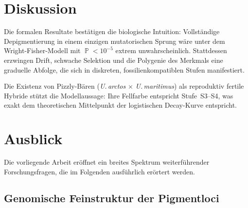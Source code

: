 ﻿\documentclass[12pt,a4paper]{article}
\theoremstyle{remark}
\DeclareMathOperator{\Prob}{\mathbb{P}}
\begin{document}
\section{Diskussion}

Die formalen Resultate best\"{a}tigen die biologische Intuition: Vollst\"{a}ndige
Depigmentierung in einem einzigen mutatorischen Sprung w\"{a}re unter dem
Wright-Fisher-Modell mit $\Prob < 10^{-5}$ extrem unwahrscheinlich.
Stattdessen erzwingen Drift, schwache Selektion und die Polygenie des
Merkmals eine graduelle Abfolge, die sich in diskreten, fossilienkompatiblen
Stufen manifestiert.

Die Existenz von Pizzly-B\"{a}ren (\textit{U.\,arctos} $\times$
\textit{U.\,maritimus}) als reproduktiv fertile Hybride st\"{u}tzt die Modellaussage:
Ihre Fellfarbe entspricht Stufe~S3--S4, was exakt dem theoretischen
Mittelpunkt der logistischen Decay-Kurve entspricht.

\section{Ausblick}
\label{sec:ausblick}

Die vorliegende Arbeit er\"{o}ffnet ein breites Spektrum weiterf\"{u}hrender
Forschungsfragen, die im Folgenden ausf\"{u}hrlich er\"{o}rtert werden.

\subsection{Genomische Feinstruktur der Pigmentloci}
\end{document}
